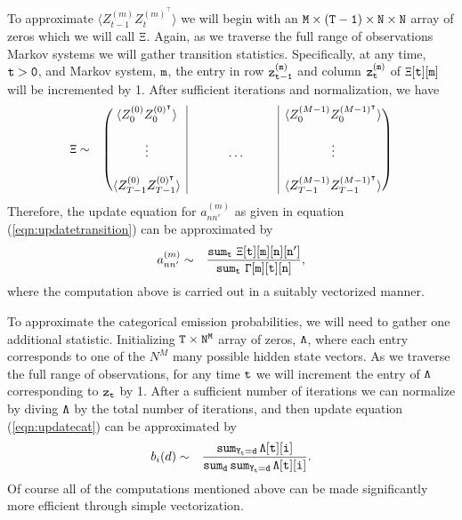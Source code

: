 \documentclass{amsart}
\begin{document}
To approximate $\langle Z_{t-1}^{(m)}Z_{t}^{(m)^\intercal}\rangle$ we 
will begin with an ${\tt M\times (T-1) \times N\times N}$ array of zeros which we 
will call ${\tt \Xi}$.  Again, as we traverse 
the full range of observations Markov systems we will gather transition statistics.  
Specifically, at any time, ${\tt t>0}$, and Markov system, ${\tt m}$, 
the entry in row ${\tt z_{t-1}^{(m)}}$ and column ${\tt z_t^{(m)}}$ 
of ${\tt \Xi[t][m]}$ will be incremented by 1. After sufficient iterations and normalization, we have
\begin{eqnarray*}
{\tt \Xi} &\sim&
\left(\begin{array}{@{}c|c@{}|c@{}}
  \begin{matrix}
\langle Z_{0}^{(0)}Z_{0}^{(0)^\intercal}\rangle 
  \end{matrix}
  & 
  &
    \begin{matrix}
\langle Z_{0}^{(M-1)}Z_{0}^{(M-1)^\intercal}\rangle 
  \end{matrix}\\
  &&\\
  \vdots&\hspace{1cm}\hdots\hspace{1cm}&\vdots\\
  &&\\
  \begin{matrix}
\langle Z_{T-1}^{(0)}Z_{T-1}^{(0)^\intercal}\rangle 
  \end{matrix}
  & 
  &
    \begin{matrix}
\langle Z_{T-1}^{(M-1)}Z_{T-1}^{(M-1)^\intercal}\rangle 
  \end{matrix}
 \end{array}\right)
 \end{eqnarray*}
Therefore, the update equation for $a_{nn'}^{(m)}$ as given in 
equation (\ref{eqn:updatetransition}) can be approximated by 
\begin{eqnarray}\label{eqn:updatetransapprox}
a_{nn'}^{(m)}&\sim& \frac{{\tt sum_t\,\,\Xi[t][m][n][n']}}{{\tt 
sum_t\,\,\Gamma[m][t][n]}},
\end{eqnarray}
where the computation above is carried out in a suitably vectorized 
manner.

To approximate the categorical emission probabilities, we will need to 
gather one additional statistic.  Initializing ${\tt T\times N^M}$ 
array of zeros, ${\tt \Lambda}$, where each entry corresponds to one of the $N^M$ 
many possible hidden state vectors.  As we traverse the full range of 
observations, for any time ${\tt t}$ we will increment the entry of 
${\tt \Lambda}$ corresponding to ${\tt z_t}$ by 1.  After a sufficient 
number of iterations we can normalize by diving ${\tt \Lambda}$ by the 
total number of iterations, and then update equation 
(\ref{eqn:updatecat}) can be approximated by 
\begin{eqnarray}\label{eqn:updatecatapprox}
b_i(d) & \sim & \frac{{\tt sum_{Y_t = d}\,\Lambda[t][i]}}{{\tt 
sum_d\,sum_{Y_t = d}\,\Lambda[t][i]}}.
\end{eqnarray}
Of course all of the computations mentioned above can be made 
significantly more efficient through simple vectorization. 
\end{document}
